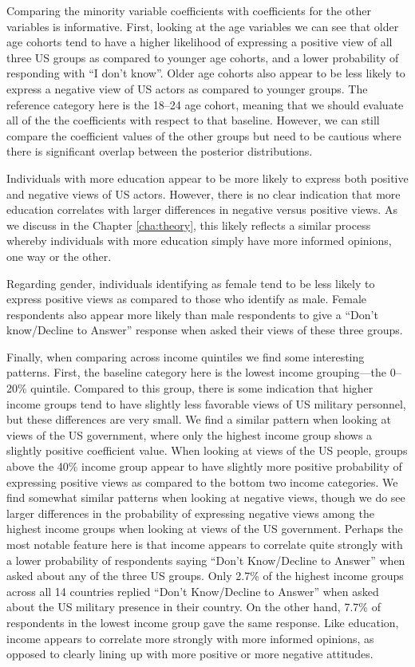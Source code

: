 Comparing the minority variable coefficients with coefficients for the other variables is informative. First, looking at the age variables we can see that older age cohorts tend to have a higher likelihood of expressing a positive view of all three US groups as compared to younger age cohorts, and a lower probability of responding with ``I don't know''. Older age cohorts also appear to be less likely to express a negative view of US actors as compared to younger groups.  The reference category here is the 18--24 age cohort, meaning that we should evaluate all of the the coefficients with respect to that baseline. However, we can still compare the coefficient values of the other groups but need to be cautious where there is significant overlap between the posterior distributions. 

Individuals with more education appear to be more likely to express both positive and negative views of US actors. However, there is no clear indication that more education correlates with larger differences in negative versus positive views. As we discuss in the Chapter \ref{cha:theory}, this likely reflects a similar process whereby individuals with more education simply have more informed opinions, one way or the other. 


Regarding gender, individuals identifying as female tend to be less likely to express positive views as compared to those who identify as male. Female respondents also appear more likely than male respondents to give a ``Don't know/Decline to Answer'' response when asked their views of these three groups.

Finally, when comparing across income quintiles we find some interesting patterns. First, the baseline category here is the lowest income grouping---the 0--20\% quintile. Compared to this group, there is some indication that higher income groups tend to have slightly less favorable views of US military personnel, but these differences are very small. We find a similar pattern when looking at views of the US government, where only the highest income group shows a slightly positive coefficient value. When looking at views of the US people, groups above the 40\% income group appear to have slightly more positive probability of expressing positive views as compared to the bottom two income categories. We find somewhat similar patterns when looking at negative views, though we do see larger differences in the probability of expressing negative views among the highest income groups when looking at views of the US government. Perhaps the most notable feature here is that income appears to correlate quite strongly with a lower probability of respondents saying ``Don't Know/Decline to Answer'' when asked about any of the three US groups. Only 2.7\% of the highest income groups across all 14 countries replied ``Don't Know/Decline to Answer'' when asked about the US military presence in their country. On the other hand, 7.7\% of respondents in the lowest income group gave the same response. Like education, income appears to correlate more strongly with more informed opinions, as opposed to clearly lining up with more positive or more negative attitudes. 

